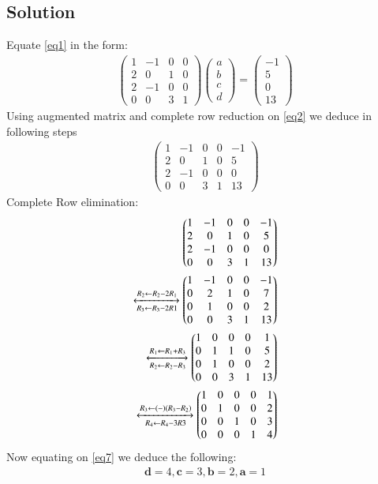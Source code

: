 \documentclass[journal,12pt,twocolumn]{IEEEtran}
\newcommand{\myvec}[1]{\ensuremath{\begin{pmatrix}#1\end{pmatrix}}}
\let\vec\mathbf
\begin{document}
\subsection{Solution}
Equate \eqref{eq1} in the form:
\begin{align}
\label{eq2}
\myvec{1&-1&0&0\\2&0&1&0\\2&-1&0&0\\0&0&3&1}
\myvec{a\\b\\c\\d}=
\myvec{-1\\5\\0\\13}
\end{align}
Using augmented matrix and complete row reduction on \eqref{eq2} we deduce in following steps
\begin{align}
\myvec{1&-1&0&0&-1\\2&0&1&0&5\\2&-1&0&0&0\\0&0&3&1&13}
\end{align}
Complete Row elimination:
\begin{align}
\myvec{1&-1&0&0&-1\\2&0&1&0&5\\2&-1&0&0&0\\0&0&3&1&13}\\
    \xleftrightarrow[R_3\leftarrow R_3-2R1]{R_2 \leftarrow R_2-2R_1}
	\myvec{1&-1&0&0&-1\\0&2&1&0&7\\0&1&0&0&2\\0&0&3&1&13}\\
	\xleftrightarrow[R_2\leftarrow R_2-R_3]{R_1 \leftarrow R_1+R_3}
    \label{eq6}
	\myvec{1&0&0&0&1\\0&1&1&0&5\\0&1&0&0&2\\0&0&3&1&13}\\
	\label{eq7}
	 \xleftrightarrow[R_4\leftarrow R_4-3R3]{R_3 \leftarrow (-)(R_3-R_2)}
	\myvec{1&0&0&0&1\\0&1&0&0&2\\0&0&1&0&3\\0&0&0&1&4}
\end{align}
Now equating on \eqref{eq7} we deduce the following:
\begin{align}
\vec{d}=4,
\vec{c}=3,
\vec{b}=2,
\vec{a}=1
\end{align}
\end{document}
